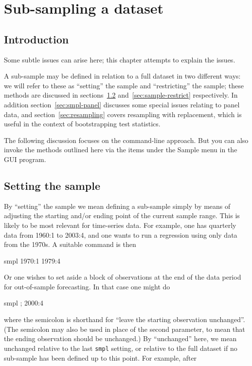 \chapter{Sub-sampling a dataset}
\label{chap:sampling}

\section{Introduction}
\label{sample-intro}

Some subtle issues can arise here; this chapter attempts to explain
the issues.

A sub-sample may be defined in relation to a full dataset in two
different ways: we will refer to these as ``setting'' the sample and
``restricting'' the sample; these methods are discussed in
sections~\ref{sec:sample-set} and~\ref{sec:sample-restrict}
respectively. In addition section~\ref{sec:smpl-panel} discusses some
special issues relating to panel data, and
section~\ref{sec:resampling} covers resampling with replacement,
which is useful in the context of bootstrapping test statistics.

The following discussion focuses on the command-line approach. But you
can also invoke the methods outlined here via the items under the
\textsf{Sample} menu in the GUI program.


\section{Setting the sample}
\label{sec:sample-set}

By ``setting'' the sample we mean defining a sub-sample simply by
means of adjusting the starting and/or ending point of the current
sample range.  This is likely to be most relevant for time-series
data.  For example, one has quarterly data from 1960:1 to 2003:4, and
one wants to run a regression using only data from the 1970s.  A
suitable command is then

\begin{code}
smpl 1970:1 1979:4
\end{code}

Or one wishes to set aside a block of observations at the end of the
data period for out-of-sample forecasting.  In that case one might do

\begin{code}
smpl ; 2000:4
\end{code}

where the semicolon is shorthand for ``leave the starting observation
unchanged''.  (The semicolon may also be used in place of the second
parameter, to mean that the ending observation should be unchanged.)
By ``unchanged'' here, we mean unchanged relative to the last
\verb+smpl+ setting, or relative to the full dataset if no sub-sample
has been defined up to this point. For example, after

